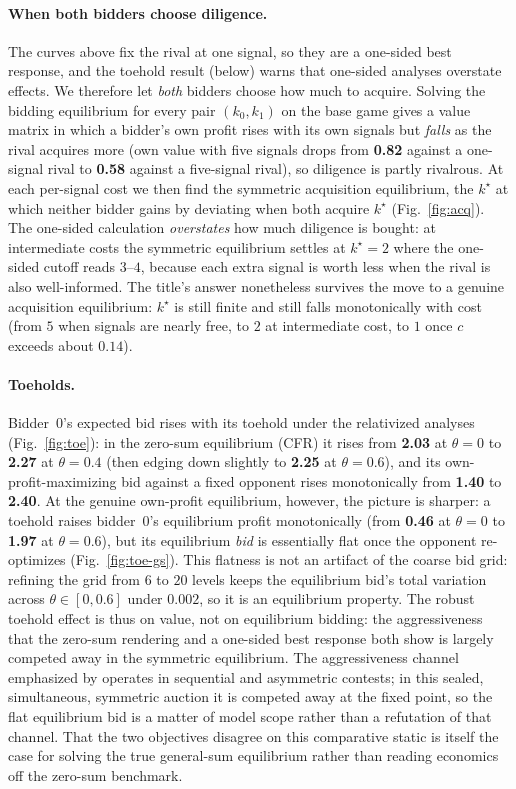 \documentclass[11pt,a4paper]{article}
\begin{document}
\paragraph{When both bidders choose diligence.} The curves above fix the rival at one
signal, so they are a one-sided best response, and the toehold result (below) warns that
one-sided analyses overstate effects. We therefore let \emph{both} bidders choose how
much to acquire. Solving the bidding equilibrium for every pair $(k_0, k_1)$ on the base
game gives a value matrix in which a bidder's own profit rises with its own signals but
\emph{falls} as the rival acquires more (own value with five signals drops from
\textbf{0.82} against a one-signal rival to \textbf{0.58} against a five-signal rival),
so diligence is partly rivalrous. At each per-signal cost we then find the symmetric
acquisition equilibrium, the $k^\star$ at which neither bidder gains by deviating when
both acquire $k^\star$ (Fig.~\ref{fig:acq}). The one-sided calculation \emph{overstates}
how much diligence is bought: at intermediate costs the symmetric equilibrium settles at
$k^\star=2$ where the one-sided cutoff reads $3$--$4$, because each extra signal is worth
less when the rival is also well-informed. The title's answer nonetheless survives the
move to a genuine acquisition equilibrium: $k^\star$ is still finite and still falls
monotonically with cost (from $5$ when signals are nearly free, to $2$ at intermediate
cost, to $1$ once $c$ exceeds about $0.14$).

\paragraph{Toeholds.} Bidder~0's expected bid rises with its toehold under the
relativized analyses (Fig.~\ref{fig:toe}): in the zero-sum equilibrium (CFR) it rises
from \textbf{2.03} at $\theta=0$ to \textbf{2.27} at $\theta=0.4$ (then edging down
slightly to \textbf{2.25} at $\theta=0.6$), and its own-profit-maximizing bid against a fixed
opponent rises monotonically from \textbf{1.40} to \textbf{2.40}. At the genuine
own-profit equilibrium, however, the picture is sharper: a toehold raises bidder~0's
equilibrium profit monotonically (from \textbf{0.46} at $\theta=0$ to \textbf{1.97} at
$\theta=0.6$), but its equilibrium \emph{bid} is essentially flat once the opponent
re-optimizes (Fig.~\ref{fig:toe-gs}). This flatness is not an artifact of the coarse bid
grid: refining the grid from $6$ to $20$ levels keeps the equilibrium bid's total
variation across $\theta\in[0,0.6]$ under $0.002$, so it is an equilibrium property. The robust toehold effect is thus on value, not
on equilibrium bidding: the aggressiveness that the zero-sum rendering and a one-sided
best response both show is largely competed away in the symmetric equilibrium. The
aggressiveness channel emphasized by \citet{bulow1999} operates in sequential and
asymmetric contests; in this sealed, simultaneous, symmetric auction it is competed away
at the fixed point, so the flat equilibrium bid is a matter of model scope rather than a
refutation of that channel. That the two objectives disagree on this comparative static
is itself the case for solving the true general-sum equilibrium rather than reading
economics off the zero-sum benchmark.
\end{document}
